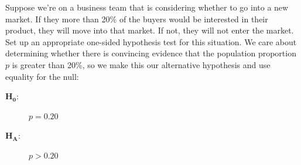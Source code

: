 \begin{example}{Suppose we're on a business team that is
    considering whether to go into a new market. If they
    more than 20\% of the buyers would be interested in
    their product, they will move into that market. If not,
    they will not enter the market. Set up an appropriate
    one-sided hypothesis test for this situation.}
  We care about determining whether there is convincing
  evidence that the population proportion $p$ is greater
  than 20\%, so we make this our alternative hypothesis
  and use equality for the null:
  \begin{description}
  \item[$\mathbf{H_0}$:] $p = 0.20$
  \item[$\mathbf{H_A}$:] $p > 0.20$
  \end{description}
\end{example}


